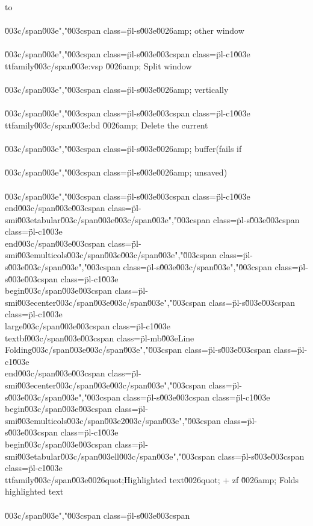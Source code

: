 to\\\\\u003c/span\u003e","\u003cspan class=\"pl-s\"\u003e\u0026amp; other window\\\\\u003c/span\u003e","\u003cspan class=\"pl-s\"\u003e\u003cspan class=\"pl-c1\"\u003e\\ttfamily\u003c/span\u003e{:vsp} \u0026amp; Split window\\\\\u003c/span\u003e","\u003cspan class=\"pl-s\"\u003e\u0026amp; vertically\\\\\u003c/span\u003e","\u003cspan class=\"pl-s\"\u003e\u003cspan class=\"pl-c1\"\u003e\\ttfamily\u003c/span\u003e{:bd} \u0026amp; Delete the current\\\\\u003c/span\u003e","\u003cspan class=\"pl-s\"\u003e\u0026amp; buffer(fails if\\\\\u003c/span\u003e","\u003cspan class=\"pl-s\"\u003e\u0026amp; unsaved)\\\\\u003c/span\u003e","\u003cspan class=\"pl-s\"\u003e\u003cspan class=\"pl-c1\"\u003e\\end\u003c/span\u003e{\u003cspan class=\"pl-smi\"\u003etabular\u003c/span\u003e}\u003c/span\u003e","\u003cspan class=\"pl-s\"\u003e\u003cspan class=\"pl-c1\"\u003e\\end\u003c/span\u003e{\u003cspan class=\"pl-smi\"\u003emulticols\u003c/span\u003e}\u003c/span\u003e","\u003cspan class=\"pl-s\"\u003e\u003c/span\u003e","\u003cspan class=\"pl-s\"\u003e\u003c/span\u003e","\u003cspan class=\"pl-s\"\u003e\u003cspan class=\"pl-c1\"\u003e\\begin\u003c/span\u003e{\u003cspan class=\"pl-smi\"\u003ecenter\u003c/span\u003e}\u003c/span\u003e","\u003cspan class=\"pl-s\"\u003e\u003cspan class=\"pl-c1\"\u003e\\large\u003c/span\u003e\u003cspan class=\"pl-c1\"\u003e\\textbf\u003c/span\u003e{\u003cspan class=\"pl-mb\"\u003eLine Folding\u003c/span\u003e}\u003c/span\u003e","\u003cspan class=\"pl-s\"\u003e\u003cspan class=\"pl-c1\"\u003e\\end\u003c/span\u003e{\u003cspan class=\"pl-smi\"\u003ecenter\u003c/span\u003e}\u003c/span\u003e","\u003cspan class=\"pl-s\"\u003e\u003c/span\u003e","\u003cspan class=\"pl-s\"\u003e\u003cspan class=\"pl-c1\"\u003e\\begin\u003c/span\u003e{\u003cspan class=\"pl-smi\"\u003emulticols\u003c/span\u003e}{2}\u003c/span\u003e","\u003cspan class=\"pl-s\"\u003e\u003cspan class=\"pl-c1\"\u003e\\begin\u003c/span\u003e{\u003cspan class=\"pl-smi\"\u003etabular\u003c/span\u003e}{ll}\u003c/span\u003e","\u003cspan class=\"pl-s\"\u003e\u003cspan class=\"pl-c1\"\u003e\\ttfamily\u003c/span\u003e{\u0026quot;Highlighted text\u0026quot; + zf} \u0026amp; Folds highlighted text\\\\\u003c/span\u003e","\u003cspan class=\"pl-s\"\u003e\u003cspan 